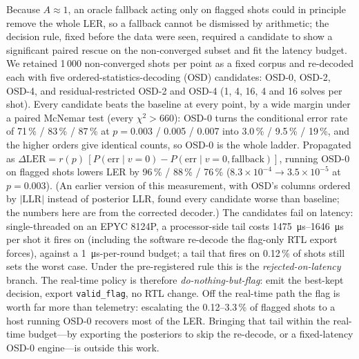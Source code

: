 Because $A \approx 1$, an oracle fallback acting only on flagged shots could
in principle remove the whole LER, so a fallback cannot be dismissed by
arithmetic; the decision rule, fixed before the data were seen, required a
candidate to show a significant paired rescue on the non-converged subset
and fit the latency budget.
We retained 1\,000 non-converged shots per point as a fixed corpus and
re-decoded each with five ordered-statistics-decoding (OSD) candidates:
OSD-0, OSD-2, OSD-4, and residual-restricted OSD-2 and OSD-4 (1, 4, 16, 4
and 16 solves per shot). Every candidate beats the baseline at every point,
by a wide margin under a paired McNemar test (every $\chi^2 > 660$): OSD-0
turns the conditional error rate of 71\,\% / 83\,\% / 87\,\% at
$p = 0.003$ / 0.005 / 0.007 into 3.0\,\% / 9.5\,\% / 19\,\%, and the higher
orders give identical counts, so OSD-0 is the whole ladder. Propagated as
$\Delta\mathrm{LER} =
r(p)\,[P(\mathrm{err}\mid v{=}0) - P(\mathrm{err}\mid v{=}0,\mathrm{fallback})]$,
running OSD-0 on flagged shots lowers LER by 96\,\% / 88\,\% / 76\,\%
($8.3\times10^{-4} \to 3.5\times10^{-5}$ at $p = 0.003$). (An earlier
version of this measurement, with OSD's columns ordered by $|\mathrm{LLR}|$
instead of posterior LLR, found every candidate worse than baseline; the
numbers here are from the corrected decoder.)
The candidates fail on latency: single-threaded on an EPYC 8124P, a
processor-side tail costs \SIrange{1475}{1646}{\micro\second} per shot it
fires on (including the software re-decode the flag-only RTL export forces),
against a \SI{1}{\micro\second}-per-round budget; a tail that fires on
0.12\,\% of shots still sets the worst case.
Under the pre-registered rule this is the \emph{rejected-on-latency} branch.
The real-time policy is therefore \emph{do-nothing-but-flag}: emit the
best-kept decision, export \texttt{valid\_flag}, no RTL change. Off the
real-time path the flag is worth far more than telemetry: escalating the
0.12--3.3\,\% of flagged shots to a host running OSD-0 recovers most of the
LER. Bringing that tail within the real-time budget---by exporting the
posteriors to skip the re-decode, or a fixed-latency OSD-0 engine---is
outside this work.

